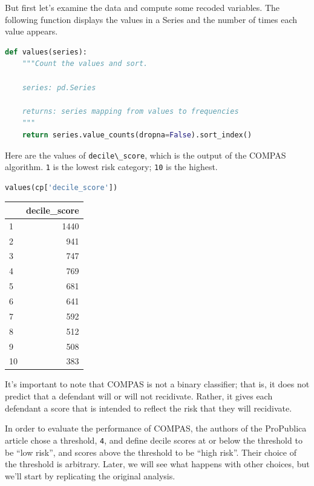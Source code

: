 But first let's examine the data and compute some recoded variables. The
following function displays the values in a Series and the number of
times each value appears.

\begin{lstlisting}[language=Python,style=source]
def values(series):
    """Count the values and sort.
    
    series: pd.Series
    
    returns: series mapping from values to frequencies
    """
    return series.value_counts(dropna=False).sort_index()
\end{lstlisting}

Here are the values of \passthrough{\lstinline!decile\_score!}, which is
the output of the COMPAS algorithm. \passthrough{\lstinline!1!} is the
lowest risk category; \passthrough{\lstinline!10!} is the highest.

\begin{lstlisting}[language=Python,style=source]
values(cp['decile_score'])
\end{lstlisting}

\begin{tabular}{lr}
\toprule
{} &  decile\_score \\
\midrule
1  &          1440 \\
2  &           941 \\
3  &           747 \\
4  &           769 \\
5  &           681 \\
6  &           641 \\
7  &           592 \\
8  &           512 \\
9  &           508 \\
10 &           383 \\
\bottomrule
\end{tabular}

It's important to note that COMPAS is not a binary classifier; that is,
it does not predict that a defendant will or will not recidivate.
Rather, it gives each defendant a score that is intended to reflect the
risk that they will recidivate.

In order to evaluate the performance of COMPAS, the authors of the
ProPublica article chose a threshold, \passthrough{\lstinline!4!}, and
define decile scores at or below the threshold to be ``low risk'', and
scores above the threshold to be ``high risk''. Their choice of the
threshold is arbitrary. Later, we will see what happens with other
choices, but we'll start by replicating the original analysis.

